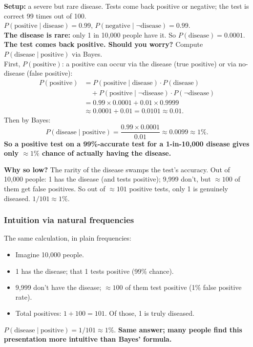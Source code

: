 \documentclass[11pt, a4paper]{article}
\begin{document}
\begin{exbox}
\textbf{Setup:} a severe but rare disease. Tests come back positive or negative; the test is correct 99 times out of 100.\\[0.3em]
$P(\text{positive} \mid \text{disease}) = 0.99$, $P(\text{negative} \mid \neg\text{disease}) = 0.99$.\\[0.3em]
\textbf{The disease is rare:} only 1 in 10{,}000 people have it. So $P(\text{disease}) = 0.0001$.\\[0.3em]
\textbf{The test comes back positive. Should you worry?} Compute $P(\text{disease} \mid \text{positive})$ via Bayes.\\[0.3em]
First, $P(\text{positive})$: a positive can occur via the disease (true positive) or via no-disease (false positive):
\begin{align*}
P(\text{positive}) &= P(\text{positive} \mid \text{disease}) \cdot P(\text{disease}) \\
                   &\quad + P(\text{positive} \mid \neg\text{disease}) \cdot P(\neg\text{disease}) \\
                   &= 0.99 \times 0.0001 + 0.01 \times 0.9999 \\
                   &\approx 0.0001 + 0.01 = 0.0101 \approx 0.01.
\end{align*}
Then by Bayes:
\[
P(\text{disease} \mid \text{positive}) = \frac{0.99 \times 0.0001}{0.01} \approx 0.0099 \approx 1\%.
\]
\textbf{So a positive test on a 99\%-accurate test for a 1-in-10{,}000 disease gives only $\approx 1\%$ chance of actually having the disease.}
\end{exbox}

\textbf{Why so low?} The rarity of the disease swamps the test's accuracy. Out of 10{,}000 people: 1 has the disease (and tests positive); 9{,}999 don't, but $\approx 100$ of them get false positives. So out of $\approx 101$ positive tests, only 1 is genuinely diseased. $1 / 101 \approx 1\%$.

\subsubsection*{Intuition via natural frequencies}

The same calculation, in plain frequencies:
\begin{itemize}
  \item Imagine 10,000 people.
  \item 1 has the disease; that 1 tests positive (99\% chance).
  \item 9,999 don't have the disease; $\approx 100$ of them test positive (1\% false positive rate).
  \item Total positives: $1 + 100 = 101$. Of those, 1 is truly diseased.
\end{itemize}
$P(\text{disease} \mid \text{positive}) = 1 / 101 \approx 1\%$. \textbf{Same answer; many people find this presentation more intuitive than Bayes' formula.}
\end{document}
